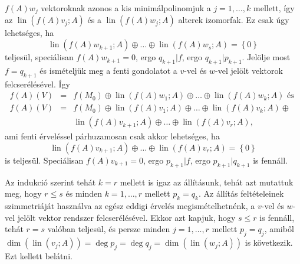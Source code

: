 \documentclass[9pt, a4paper, showtrims]{memoir}
\makeatletter
\renewenvironment{proof}[1][\proofname]
    {\par\pushQED{\qed}%
    \normalfont \topsep6\p@\@plus6\p@\relax
    \trivlist
    \item[\hskip\labelsep
        \itshape
    #1\@addpunct{:}]\ignorespaces}
    {\popQED\endtrivlist\@endpefalse}
\theoremstyle{plain}
\theoremstyle{remark}
\theoremstyle{definition}
\DeclareMathOperator{\lin}{lin}
\makeatother
\begin{document}
\begin{proof}
    $f\left( A \right)w_j$ vektoroknak azonos a kis minimálpolinomjuk a $j=1,\ldots,k$ mellett,
    így az 
    $\lin\left( f\left( A \right)v_j;A \right)$ és a 
    $\lin\left( f\left( A \right)w_j;A \right)$ alterek izomorfak.
    Ez csak úgy lehetséges, ha
    \[
        \lin\left( f\left( A \right)w_{k+1};A \right)
        \oplus\ldots\oplus
        \lin\left( f\left( A \right)w_s;A \right)
        =
        \left\{ 0 \right\}
    \]
    teljesül,
    speciálisan $f\left( A \right)w_{k+1}=0$, ergo $q_{k+1}|f$, ergo $q_{k+1}|p_{k+1}$.
    Jelölje most $f=q_{k+1}$ és ismételjük meg a fenti gondolatot a $v$-vel és $w$-vel jelölt vektorok felcserélésével.
    Így
    \begin{eqnarray*}
        f\left( A \right)(V)
        &=& 
        f\left( M_0 \right)
        \oplus
        \lin\left( f\left( A \right)w_1;A \right)
        \oplus\ldots\oplus
        \lin\left( f\left( A \right)w_k;A \right)
        \text{ és }
        \\
        f\left( A \right)(V)
        &=& 
        f\left( M_0 \right)
        \oplus
        \lin\left( f\left( A \right)v_1;A \right)
        \oplus\ldots\oplus
        \lin\left( f\left( A \right)v_k;A \right)
        \oplus
        \\
        &&
        \lin\left( f\left( A \right)v_{k+1};A \right)
        \oplus\ldots\oplus
        \lin\left( f\left( A \right)v_r;A \right),
    \end{eqnarray*}
    ami fenti érveléssel párhuzamosan csak akkor lehetséges, 
    ha
    \[
        \lin\left( f\left( A \right)v_{k+1};A \right)
        \oplus\ldots\oplus
        \lin\left( f\left( A \right)v_r;A \right)
        =
        \left\{ 0 \right\}
    \]
    is teljesül.
    Speciálisan $f\left( A \right)v_{k+1}=0$, ergo $p_{k+1}|f$, ergo $p_{k+1}|q_{k+1}$ is fennáll.

    Az indukció szerint tehát $k=r$ mellett is igaz az állításunk,
    tehát azt mutattuk meg, hogy $r\leq s$ és minden $k=1,\ldots,r$ mellett $p_k=q_k$.
    Az állítás feltételeinek szimmetriáját használva az egész eddigi érvelés megismételhetnénk, 
    a $v$-vel és $w$-vel jelölt vektor rendszer felcserélésével.
    Ekkor azt kapjuk, hogy $s\leq r$ is fennáll, tehát $r=s$ valóban teljesül, 
    és persze minden $j=1,\ldots,r$ mellett $p_j=q_j$,
    amiből 
    $
    \dim\left( \lin\left( v_j;A \right) \right)
    =
    \deg p_j
    =
    \deg q_j
    =
    \dim\left( \lin\left( w_j;A \right) \right)
    $
    is következik.
    Ezt kellett belátni. 
\end{proof}
\end{document}

